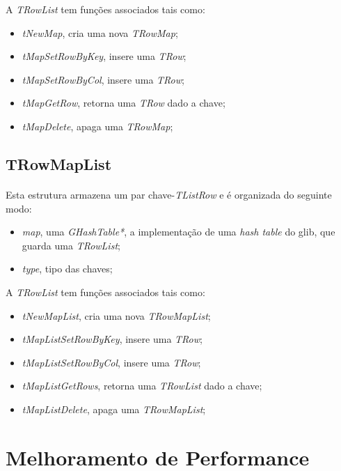 \documentclass[a4paper, 10pt]{article}
\begin{document}
A \emph{TRowList} tem funções associados tais como:
\begin{itemize}
	\item \emph{tNewMap}, cria uma nova \emph{TRowMap};
	\item \emph{tMapSetRowByKey}, insere uma \emph{TRow};
	\item \emph{tMapSetRowByCol}, insere uma \emph{TRow};
	\item \emph{tMapGetRow}, retorna uma \emph{TRow} dado a chave;
	\item \emph{tMapDelete}, apaga uma \emph{TRowMap};
\end{itemize}

\subsection{TRowMapList}
\label{sssec:MapList}

\paragraph{ }

Esta estrutura armazena um par chave-\emph{TListRow} e é organizada do seguinte modo:
\begin{itemize}
	\item \emph{map}, uma \emph{GHashTable*}, a implementação de uma \emph{hash table} do glib, que guarda uma \emph{TRowList};
	\item \emph{type}, tipo das chaves;
\end{itemize}

A \emph{TRowList} tem funções associados tais como:
\begin{itemize}
	\item \emph{tNewMapList}, cria uma nova \emph{TRowMapList};
	\item \emph{tMapListSetRowByKey}, insere uma \emph{TRow};
	\item \emph{tMapListSetRowByCol}, insere uma \emph{TRow};
	\item \emph{tMapListGetRows}, retorna uma \emph{TRowList} dado a chave;
	\item \emph{tMapListDelete}, apaga uma \emph{TRowMapList};
\end{itemize}

\section{Melhoramento de Performance}
\label{sec:MP}
\paragraph{ }
\end{document}
